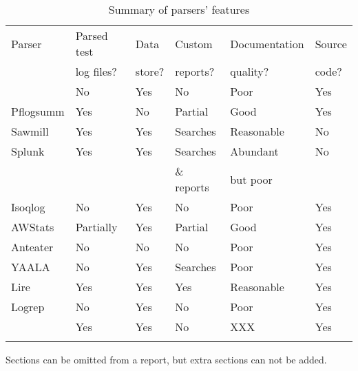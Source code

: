 \begin{table}[htb]
    \caption{Summary of parsers' features}
    \empty{}\label{Summary of parsers' features}
    \begin{tabular}{llllll}
        Parser          & Parsed test   & Data              & Custom            & Documentation  & Source \\
                        & log files?    & store?            & reports?          & quality?       & code?  \\
        \tableline{}%
        \LMA{}          & No            & Yes               & No                & Poor           & Yes    \\ 
        Pflogsumm       & Yes           & No                & Partial \dag{}    & Good           & Yes    \\
        Sawmill         & Yes           & Yes               & Searches          & Reasonable     & No     \\
        Splunk          & Yes           & Yes               & Searches          & Abundant       & No     \\
                        &               &                   & \& reports        & but poor       &        \\
        Isoqlog         & No            & Yes               & No                & Poor           & Yes    \\
        AWStats         & Partially     & Yes               & Partial \dag{}    & Good           & Yes    \\
        Anteater        & No            & No                & No                & Poor           & Yes    \\
        YAALA           & No            & Yes \ddag{}       & Searches          & Poor           & Yes    \\
        Lire            & Yes           & Yes               & Yes               & Reasonable     & Yes    \\
        Logrep          & No            & Yes               & No                & Poor           & Yes    \\
        \parsername{}   & Yes           & Yes \nialpha{}    & No \nibeta{}      & XXX            & Yes    \\
        \tableline{}
    \end{tabular}

    \begin{eqlist}

        \item [\dag{}] Sections can be omitted from a report, but extra
            sections can not be added.


\end{eqlist}
\end{table}
